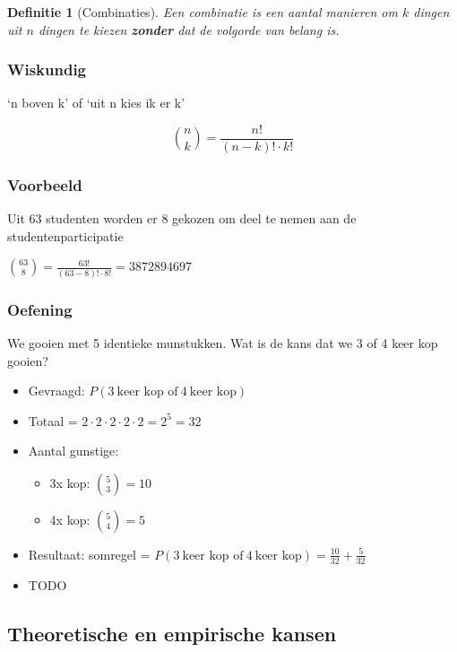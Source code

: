 \documentclass{article}
\newtheorem{theorem}{Definitie}[section]
\begin{document}
\begin{theorem}[Combinaties]
    Een combinatie is een aantal manieren om $k$ dingen uit $n$ dingen te kiezen \textbf{zonder} dat de volgorde van belang is.
\end{theorem}

\subsubsection{Wiskundig}

`n boven k' of `uit n kies ik er k'

\begin{equation}
    \binom{n}{k} = \frac{n!}{(n-k)! \cdot k!}
\end{equation}

\subsubsection{Voorbeeld}

Uit 63 studenten worden er 8 gekozen om deel te nemen aan de studentenparticipatie

$\binom{63}{8} = \frac{63!}{(63-8)! \cdot 8!} = 3 872 894 697$


\subsubsection{Oefening}

We gooien met 5 identieke munstukken. Wat is de kans dat we 3 of 4 keer kop gooien?

\begin{itemize}
    \item Gevraagd: $P(3\ \text{keer kop of}\ 4\ \text{keer kop})$
    \item Totaal = $2 \cdot 2 \cdot 2 \cdot 2 \cdot 2 = 2^5 = 32$
    \item Aantal gunstige:
    \begin{itemize}
        \item 3x kop: $\binom{5}{3} = 10$
        \item 4x kop: $\binom{5}{4} = 5$
    \end{itemize}
    \item Resultaat: somregel = $P(3\ \text{keer kop of}\ 4\ \text{keer kop}) = \frac{10}{32} + \frac{5}{32}$
    \item TODO
\end{itemize}

\subsection{Theoretische en empirische kansen}
\end{document}

